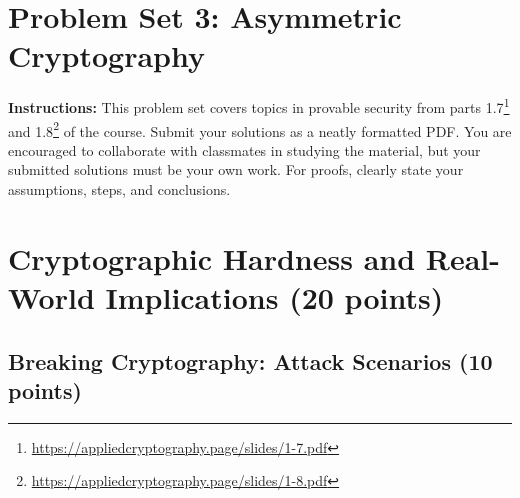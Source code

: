 \documentclass[10pt,a4paper,american]{article}
\begin{document}
\classhandoutheader

\section*{Problem Set 3: Asymmetric Cryptography}

\begin{tcolorbox}[colframe=OliveGreen!30!white,colback=OliveGreen!5!white]
	\textbf{Instructions:} This problem set covers topics in provable security from parts 1.7\footnote{\url{https://appliedcryptography.page/slides/1-7.pdf}} and 1.8\footnote{\url{https://appliedcryptography.page/slides/1-8.pdf}} of the course. Submit your solutions as a neatly formatted PDF. You are encouraged to collaborate with classmates in studying the material, but your submitted solutions must be your own work. For proofs, clearly state your assumptions, steps, and conclusions.
\end{tcolorbox}

\section{Cryptographic Hardness and Real-World Implications (20 points)}

\subsection{Breaking Cryptography: Attack Scenarios (10 points)}
\end{document}
